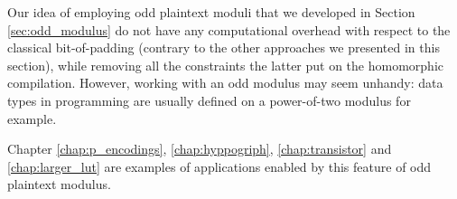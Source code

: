 Our idea of employing odd plaintext moduli that we developed in Section \ref{sec:odd_modulus} do not have any computational overhead with respect to the classical bit-of-padding (contrary to the other approaches we presented in this section), while removing all the constraints the latter put on the homomorphic compilation. However, working with an odd modulus may seem unhandy: data types in programming are usually defined on a power-of-two modulus for example.

Chapter \ref{chap:p_encodings}, \ref{chap:hyppogriph}, \ref{chap:transistor} and \ref{chap:larger_lut} are examples of applications enabled by this feature of odd plaintext modulus.

